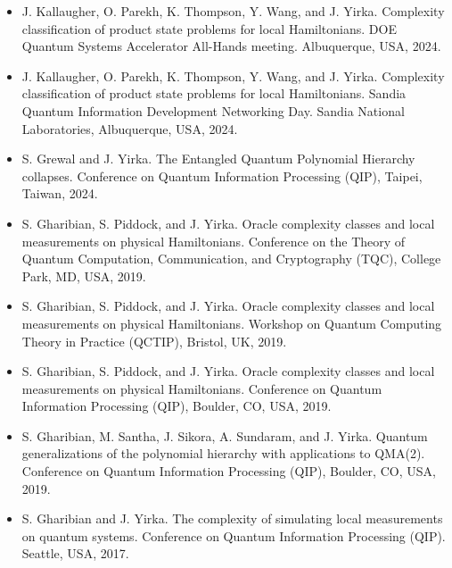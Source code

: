 \documentclass[11pt,letterpaper,serif]{moderncv}
\begin{document}
\begin{itemize}
	\item[$\blacktriangleright$]
	J. Kallaugher, O. Parekh, K. Thompson, Y. Wang, and J. Yirka.\quad
	Complexity classification of product state problems for local Hamiltonians.\quad
	DOE Quantum Systems Accelerator All-Hands meeting. Albuquerque, USA, 2024.

	\item[$\blacktriangleright$]
	J. Kallaugher, O. Parekh, K. Thompson, Y. Wang, and J. Yirka.\quad
	Complexity classification of product state problems for local Hamiltonians.\quad
	Sandia Quantum Information Development Networking Day. Sandia National Laboratories, Albuquerque, USA, 2024.

	\item[$\blacktriangleright$]
	S. Grewal and J. Yirka.\quad
	The Entangled Quantum Polynomial Hierarchy collapses.\quad
	Conference on Quantum Information Processing (QIP), Taipei, Taiwan, 2024.

	\item[$\smalltriangleright$]
	S. Gharibian, S. Piddock, and J. Yirka.\quad
	Oracle complexity classes and local measurements on physical Hamiltonians.\quad
	Conference on the Theory of Quantum Computation, Communication, and Cryptography (TQC), College Park, MD, USA, 2019.

	\item[$\smalltriangleright$]
	S. Gharibian, S. Piddock, and J. Yirka.\quad
	Oracle complexity classes and local measurements on physical Hamiltonians.\quad
	Workshop on Quantum Computing Theory in Practice (QCTIP), Bristol, UK, 2019.

	\item[$\filledtriangleright$]
	S. Gharibian, S. Piddock, and J. Yirka.\quad
	Oracle complexity classes and local measurements on physical Hamiltonians.\quad
	Conference on Quantum Information Processing (QIP), Boulder, CO, USA, 2019.

	\item[$\smalltriangleright$]
	S. Gharibian, M. Santha, J. Sikora, A. Sundaram, and J. Yirka.\quad
	Quantum generalizations of the polynomial hierarchy with applications to QMA(2).\quad
	Conference on Quantum Information Processing (QIP), Boulder, CO, USA, 2019.

	\item[$\filledtriangleright$]
	S. Gharibian and J. Yirka.\quad
	The complexity of simulating local measurements on quantum systems.\quad
	Conference on Quantum Information Processing (QIP). Seattle, USA, 2017.
\end{itemize}
\end{document}
